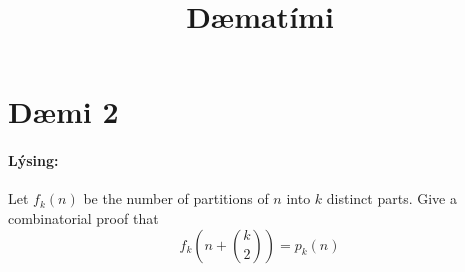 \documentclass[a4paper,notitlepage]{article}
\title{Dæmatími}
\date{}
\author{}
\theoremstyle{plain}
\theoremstyle{definition}
\begin{document}
\maketitle
\thispagestyle{firstpage}

\section*{Dæmi 2}
\paragraph{Lýsing:}
Let $f_k(n)$ be the number of partitions of $n$ into $k$ distinct parts. Give a combinatorial proof that
\begin{equation*}
    f_k\left(n + \binom{k}{2}\right) = p_k(n)
\end{equation*}
\end{document}
